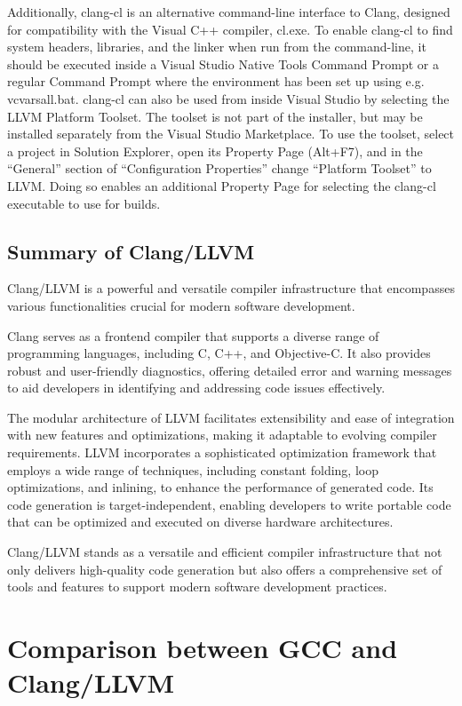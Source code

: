 \documentclass[conference]{IEEEtran}
\begin{document}
Additionally, clang-cl is an alternative command-line interface to Clang, designed for compatibility with the Visual C++ compiler, cl.exe. To enable clang-cl to find system headers, libraries, and the linker when run from the command-line, it should be executed inside a Visual Studio Native Tools Command Prompt or a regular Command Prompt where the environment has been set up using e.g. vcvarsall.bat. clang-cl can also be used from inside Visual Studio by selecting the LLVM Platform Toolset. The toolset is not part of the installer, but may be installed separately from the Visual Studio Marketplace. To use the toolset, select a project in Solution Explorer, open its Property Page (Alt+F7), and in the “General” section of “Configuration Properties” change “Platform Toolset” to LLVM. Doing so enables an additional Property Page for selecting the clang-cl executable to use for builds.\cite{b13}

\subsection{Summary of Clang/LLVM}

Clang/LLVM is a powerful and versatile compiler infrastructure that encompasses various functionalities crucial for modern software development.

Clang serves as a frontend compiler that supports a diverse range of programming languages, including C, C++, and Objective-C. It also provides robust and user-friendly diagnostics, offering detailed error and warning messages to aid developers in identifying and addressing code issues effectively.

The modular architecture of LLVM facilitates extensibility and ease of integration with new features and optimizations, making it adaptable to evolving compiler requirements. LLVM incorporates a sophisticated optimization framework that employs a wide range of techniques, including constant folding, loop optimizations, and inlining, to enhance the performance of generated code. Its code generation is target-independent, enabling developers to write portable code that can be optimized and executed on diverse hardware architectures.

Clang/LLVM stands as a versatile and efficient compiler infrastructure that not only delivers high-quality code generation but also offers a comprehensive set of tools and features to support modern software development practices.

\section{Comparison between GCC and Clang/LLVM}
\end{document}
